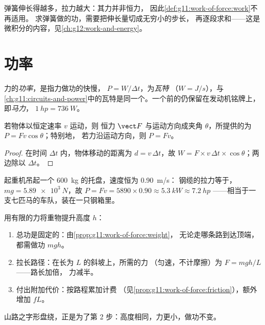 \begin{remark}[弹簧呢？]\label{rem:g11:work-of-force:spring}
弹簧伸长得越多，拉力越大：其力并非恒力，
因此\cref{def:g11:work-of-force:work}不再适用。
求弹簧做的功，需要把伸长量切成无穷小的步长，
再逐段求和——这是微积分的内容，见\cref{ch:g12:work-and-energy}。
\end{remark}

\section{功率}

\begin{definition}[功率]\label{def:g11:work-of-force:power}
力的\emph{功率}，是指力做功的快慢，
$P = W/\Delta t$，为\emph{瓦特}
（$\unit{W} = \unit{J/s}$），与
\cref{ch:g11:circuits-and-power}中的瓦特是同一个。一个前的仍保留在发动机铭牌上，
即\emph{马力}，
$\qty{1}{hp} = \qty{736}{W}$。
\end{definition}

\begin{proposition}[匀速时的功率]\label{prop:g11:work-of-force:pfv}
若物体以恒定速率 $v$ 运动，则
恒力 $\vect F$ 与运动方向成夹角 $\theta$，所提供的为
$P = F v \cos\theta$；特别地，
若力沿运动方向，则 $P = Fv$。
\end{proposition}

\begin{proof}
在时间 $\Delta t$ 内，物体移动的距离为 $d = v\,\Delta t$，故
$W = F \times v\,\Delta t \times \cos\theta$；两边除以 $\Delta t$。
\end{proof}

\begin{example}[起重机]\label{ex:g11:work-of-force:crane}
起重机吊起一个 \qty{600}{kg} 的托盘，速度恒为 \qty{0.90}{m/s}：
钢缆的拉力等于，$mg = \qty{5.89e3}{N}$，故
$P = Fv = 5890 \times 0.90 \approx \qty{5.3}{kW} \approx \qty{7.2}{hp}$
——相当于一支七匹马的车队，装在一只钢箱里。
\end{example}

\begin{method}\label{met:g11:work-of-force:zigzag}
用有限的力将重物提升高度 $h$：
\begin{enumerate}
  \item 总功是固定的：由\cref{prop:g11:work-of-force:weight}，
        无论走哪条路到达顶端，都需做功 $mgh$。
  \item 拉长路径：在长为 $L$ 的斜坡上，所需的力
        （匀速，不计摩擦）为 $F = mgh/L$——路长加倍，
        力减半。
  \item 付出附加代价：按路程累加计费
        （见\cref{prop:g11:work-of-force:friction}），额外增加 $fL$。
\end{enumerate}
山路之字形盘绕，正是为了第 2 步：高度相同，力更小，做功不变。
\end{method}

